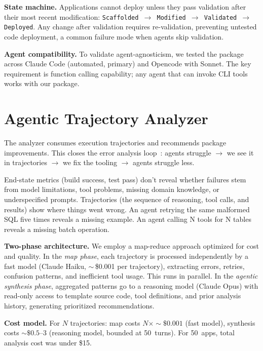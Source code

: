 \documentclass[sigconf,review]{acmart}
\begin{document}
\textbf{State machine.} Applications cannot deploy unless they pass validation after their most recent modification: \texttt{Scaffolded $\to$ Modified $\to$ Validated $\to$ Deployed}. Any change after validation requires re-validation, preventing untested code deployment, a common failure mode when agents skip validation.

\textbf{Agent compatibility.} To validate agent-agnosticism, we tested the package across Claude Code (automated, primary) and Opencode with Sonnet. The key requirement is function calling capability; any agent that can invoke CLI tools works with our package.

\section{Agentic Trajectory Analyzer}
\label{sec:trajectory}

The analyzer consumes execution trajectories and recommends package improvements. This closes the error analysis loop~\cite{kravchenko2025mlsystem}: agents struggle $\to$ we see it in trajectories $\to$ we fix the tooling $\to$ agents struggle less.

End-state metrics (build success, test pass) don't reveal whether failures stem from model limitations, tool problems, missing domain knowledge, or underspecified prompts. Trajectories (the sequence of reasoning, tool calls, and results) show where things went wrong. An agent retrying the same malformed SQL five times reveals a missing example. An agent calling N tools for N tables reveals a missing batch operation.

\textbf{Two-phase architecture.} We employ a map-reduce approach optimized for cost and quality. In the \emph{map phase}, each trajectory is processed independently by a fast model (Claude Haiku, ${\sim}\,$\$0.001 per trajectory), extracting errors, retries, confusion patterns, and inefficient tool usage. This runs in parallel. In the \emph{agentic synthesis phase}, aggregated patterns go to a reasoning model (Claude Opus) with read-only access to template source code, tool definitions, and prior analysis history, generating prioritized recommendations.

\textbf{Cost model.} For $N$ trajectories: map costs $N \times {\sim}\$0.001$ (fast model), synthesis costs ${\sim}\$0.5$--3 (reasoning model, bounded at 50~turns). For 50~apps, total analysis cost was under \$15.
\end{document}
